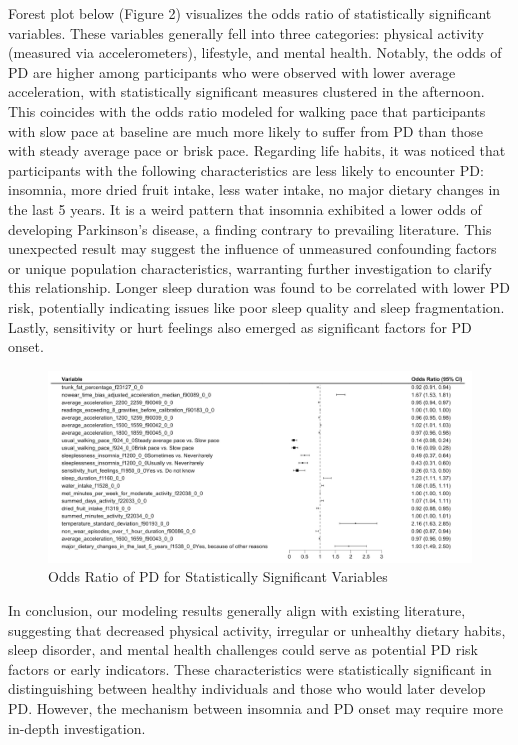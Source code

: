\documentclass[12pt,]{article}
\begin{document}
Forest plot below (Figure 2) visualizes the odds ratio of statistically
significant variables. These variables generally fell into three
categories: physical activity (measured via accelerometers), lifestyle,
and mental health. Notably, the odds of PD are higher among participants
who were observed with lower average acceleration, with statistically
significant measures clustered in the afternoon. This coincides with the
odds ratio modeled for walking pace that participants with slow pace at
baseline are much more likely to suffer from PD than those with steady
average pace or brisk pace. Regarding life habits, it was noticed that
participants with the following characteristics are less likely to
encounter PD: insomnia, more dried fruit intake, less water intake, no
major dietary changes in the last 5 years. It is a weird pattern that
insomnia exhibited a lower odds of developing Parkinson's disease, a
finding contrary to prevailing literature. This unexpected result may
suggest the influence of unmeasured confounding factors or unique
population characteristics, warranting further investigation to clarify
this relationship. Longer sleep duration was found to be correlated with
lower PD risk, potentially indicating issues like poor sleep quality and
sleep fragmentation. Lastly, sensitivity or hurt feelings also emerged
as significant factors for PD onset.

\begin{figure}
\centering
\includegraphics{../figure/Figure 2 - Odds Ratio of PD for Statistically Significant Variables.png}
\caption{Odds Ratio of PD for Statistically Significant Variables}
\end{figure}

In conclusion, our modeling results generally align with existing
literature, suggesting that decreased physical activity, irregular or
unhealthy dietary habits, sleep disorder, and mental health challenges
could serve as potential PD risk factors or early indicators. These
characteristics were statistically significant in distinguishing between
healthy individuals and those who would later develop PD. However, the
mechanism between insomnia and PD onset may require more in-depth
investigation.
\end{document}
